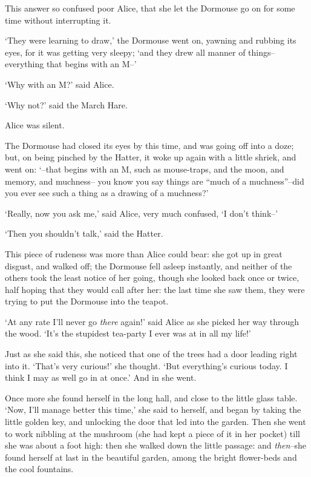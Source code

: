   This answer so confused poor Alice, that she let the Dormouse
go on for some time without interrupting it.

  `They were learning to draw,' the Dormouse went on, yawning and
rubbing its eyes, for it was getting very sleepy; `and they drew
all manner of things--everything that begins with an M--'

  `Why with an M?' said Alice.

  `Why not?' said the March Hare.

  Alice was silent.

  The Dormouse had closed its eyes by this time, and was going
off into a doze; but, on being pinched by the Hatter, it woke up
again with a little shriek, and went on:  `--that begins with an
M, such as mouse-traps, and the moon, and memory, and muchness--
you know you say things are ``much of a muchness''--did you ever
see such a thing as a drawing of a muchness?'

  `Really, now you ask me,' said Alice, very much confused, `I
don't think--'

  `Then you shouldn't talk,' said the Hatter.

  This piece of rudeness was more than Alice could bear:  she got
up in great disgust, and walked off; the Dormouse fell asleep
instantly, and neither of the others took the least notice of her
going, though she looked back once or twice, half hoping that
they would call after her:  the last time she saw them, they were
trying to put the Dormouse into the teapot.

  `At any rate I'll never go {\it there} again!' said Alice as she
picked her way through the wood.  `It's the stupidest tea-party I
ever was at in all my life!'

  Just as she said this, she noticed that one of the trees had a
door leading right into it.  `That's very curious!' she thought.
`But everything's curious today.  I think I may as well go in at once.'
And in she went.

  Once more she found herself in the long hall, and close to the
little glass table.  `Now, I'll manage better this time,'
she said to herself, and began by taking the little golden key,
and unlocking the door that led into the garden.  Then she went
to work nibbling at the mushroom (she had kept a piece of it
in her pocket) till she was about a foot high:  then she walked down
the little passage:  and {\it then}--she found herself at last in the
beautiful garden, among the bright flower-beds and the cool fountains.



